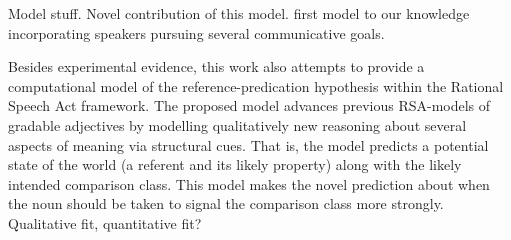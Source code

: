 
Model stuff. 
Novel contribution of this model.   
first model to our knowledge incorporating speakers pursuing several communicative goals. 

Besides experimental evidence, this work also attempts to provide a computational model of the reference-predication hypothesis within the Rational Speech Act framework. The proposed model advances previous RSA-models of gradable adjectives by modelling qualitatively new reasoning about several aspects of meaning via structural cues. That is, the model predicts a potential state of the world (a referent and its likely property) along with the likely intended  comparison class.  This model makes the novel prediction about when the noun should be taken to signal the comparison class more strongly. Qualitative fit, quantitative fit?

